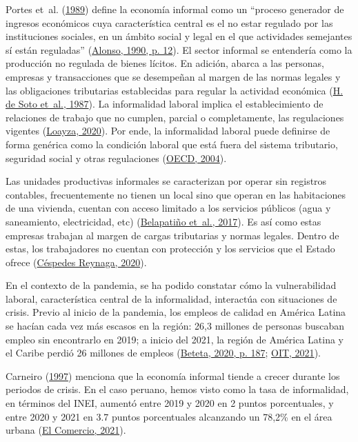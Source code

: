 \documentclass[
  letterpaper,
  12pt,
  oneside,
  spanish,
  doublespacing,
  headsepline,
  parskip]{MastersDoctoralThesis}
\begin{document}
Portes et~al. (\protect\hyperlink{ref-theinfo1989}{1989}) define la
economía informal como un ``proceso generador de ingresos económicos
cuya característica central es el no estar regulado por las
instituciones sociales, en un ámbito social y legal en el que
actividades semejantes sí están reguladas''
(\protect\hyperlink{ref-alonso1990}{Alonso, 1990, p. 12}). El sector
informal se entendería como la producción no regulada de bienes lícitos.
En adición, abarca a las personas, empresas y transacciones que se
desempeñan al margen de las normas legales y las obligaciones
tributarias establecidas para regular la actividad económica
(\protect\hyperlink{ref-desoto1987}{H. de Soto et~al., 1987}). La
informalidad laboral implica el establecimiento de relaciones de trabajo
que no cumplen, parcial o completamente, las regulaciones vigentes
(\protect\hyperlink{ref-loayza2020}{Loayza, 2020}). Por ende, la
informalidad laboral puede definirse de forma genérica como la condición
laboral que está fuera del sistema tributario, seguridad social y otras
regulaciones (\protect\hyperlink{ref-oecd2004}{OECD, 2004}).

Las unidades productivas informales se caracterizan por operar sin
registros contables, frecuentemente no tienen un local sino que operan
en las habitaciones de una vivienda, cuentan con acceso limitado a los
servicios públicos (agua y saneamiento, electricidad, etc)
(\protect\hyperlink{ref-belapatiuxf1o2017}{Belapatiño et~al., 2017}). Es
así como estas empresas trabajan al margen de cargas tributarias y
normas legales. Dentro de estas, los trabajadores no cuentan con
protección y los servicios que el Estado ofrece
(\protect\hyperlink{ref-cuxe9spedesreynaga2020}{Céspedes Reynaga,
2020}).

En el contexto de la pandemia, se ha podido constatar cómo la
vulnerabilidad laboral, característica central de la informalidad,
interactúa con situaciones de crisis. Previo al inicio de la pandemia,
los empleos de calidad en América Latina se hacían cada vez más escasos
en la región: 26,3 millones de personas buscaban empleo sin encontrarlo
en 2019; a inicio del 2021, la región de América Latina y el Caribe
perdió 26 millones de empleos
(\protect\hyperlink{ref-beteta2020}{Beteta, 2020, p. 187};
\protect\hyperlink{ref-oit2021}{OIT, 2021}).

Carneiro (\protect\hyperlink{ref-carneiro1997}{1997}) menciona que la
economía informal tiende a crecer durante los periodos de crisis. En el
caso peruano, hemos visto como la tasa de informalidad, en términos del
INEI, aumentó entre 2019 y 2020 en 2 puntos porcentuales, y entre 2020 y
2021 en 3.7 puntos porcentuales alcanzando un 78,2\% en el área urbana
(\protect\hyperlink{ref-elcomercio2021}{El Comercio, 2021}).
\end{document}
